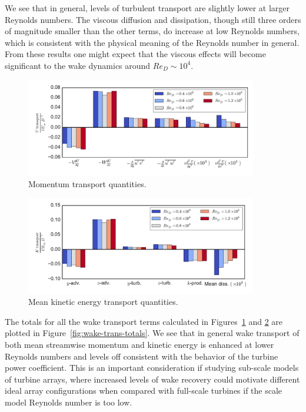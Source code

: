 \documentclass[energies,article,accept,moreauthors,pdftex,12pt,a4paper]{mdpi}
\begin{document}
We see that in general, levels of turbulent transport are slightly lower at
larger Reynolds numbers. The viscous diffusion and dissipation, though still
three orders of magnitude smaller than the other terms, do increase at low
Reynolds numbers, which is consistent with the physical meaning of the Reynolds
number in general. From these results one might expect that the viscous effects
will become significant to the wake dynamics around $Re_D \sim 10^4$.

\begin{figure}[ht!]
\centering
\includegraphics[width=0.9\textwidth]{figures/mom_bar_graph}
\caption{Momentum transport quantities.}
\label{fig:mom-bar-graph}
\end{figure}

\begin{figure}[ht!]
\centering
\includegraphics[width=0.9\textwidth]{figures/K_trans_bar_graph}
\caption{Mean kinetic energy transport quantities.}
\label{fig:K-bar-graph}
\end{figure}

The totals for all the wake transport terms calculated in
Figures~\ref{fig:mom-bar-graph} and \ref{fig:K-bar-graph} are plotted in
Figure~\ref{fig:wake-trans-totals}. We see that in general wake transport of
both mean streamwise momentum and kinetic energy is enhanced at lower Reynolds
numbers and levels off consistent with the behavior of the turbine power
coefficient. This is an important consideration if studying sub-scale models of
turbine arrays, where increased levels of wake recovery could motivate different
ideal array configurations when compared with full-scale turbines if the scale
model Reynolds number is too low.
\end{document}
